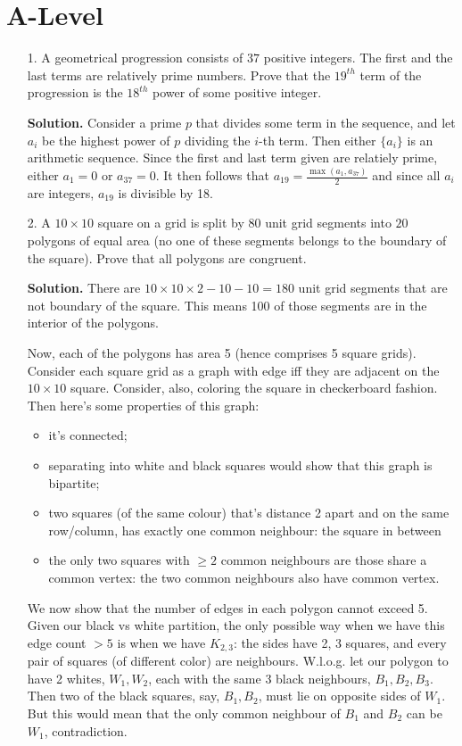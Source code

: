 \documentclass[11pt,a4paper]{article}
\begin{document}
\section*{A-Level}
\begin{enumerate}
	\item[1.]
	A geometrical progression consists of $37$ positive integers. 
	The first and the last terms are relatively prime numbers. 
	Prove that the $19^{th}$ term of the progression is the $18^{th}$ power of some positive integer.
	
	\textbf{Solution.} 
	Consider a prime $p$ that divides some term in the sequence, 
	and let $a_i$ be the highest power of $p$ dividing the $i$-th term. 
	Then either $\{a_i\}$ is an arithmetic sequence. 
	Since the first and last term given are relatiely prime, either $a_1=0$ or $a_{37}=0$. 
	It then follows that $a_{19} = \frac{\max(a_1, a_{37})}{2}$ and since all $a_i$ are integers, 
	$a_{19}$ is divisible by 18. 
		
	\item[2.]
	A $10 \times 10$ square on a grid is split by $80$ unit grid segments into $20$ polygons of equal area (no one of these segments belongs to the boundary of the square). 
	Prove that all polygons are congruent.
	
	\textbf{Solution.} 
	There are $10\times 10 \times 2 - 10-10=180$ unit grid segments that are not boundary of the square. 
	This means 100 of those segments are in the interior of the polygons. 
	
	Now, each of the polygons has area 5 (hence comprises 5 square grids). 
	Consider each square grid as a graph with edge iff they are adjacent on the $10\times 10$ square. 
	Consider, also, coloring the square in checkerboard fashion. Then here's some properties of this graph: 
	\begin{itemize}
		\item it's connected;
		\item separating into white and black squares would show that this graph is bipartite;
		\item two squares (of the same colour) that's distance 2 apart and on the same row/column, 
		has exactly one common neighbour: the square in between
		\item the only two squares with $\ge 2$ common neighbours are those share a common vertex: 
		the two common neighbours also have common vertex. 
	\end{itemize}
	
	We now show that the number of edges in each polygon cannot exceed 5. 
	Given our black vs white partition, the only possible way when we have this edge count $>5$ is when we have $K_{2, 3}$: the sides have 2, 3 squares, and every pair of  squares (of different color) are neighbours. 
	W.l.o.g. let our polygon to have 2 whites, $W_1, W_2$, each with the same 3 black neighbours, $B_1, B_2, B_3$. 
	Then two of the black squares, say, $B_1, B_2$, must lie on opposite sides of $W_1$. 
	But this would mean that the only common neighbour of $B_1$ and $B_2$ can be $W_1$, 
	contradiction. 
	

\end{enumerate}
\end{document}

